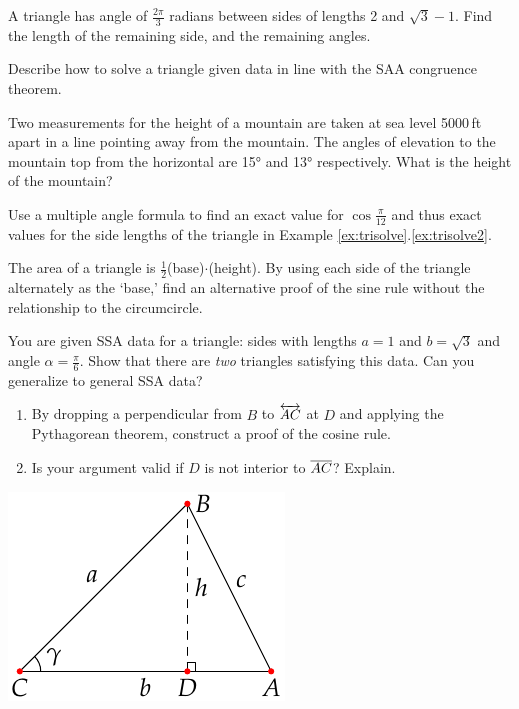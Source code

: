 \begin{exercises}{}{}
	\exstart A triangle has angle of $\frac{2\pi}3$ radians between sides of lengths 2 and $\sqrt 3-1$. Find the length of the remaining side, and the remaining angles.\vspace{-2pt}
	\begin{enumerate}\setcounter{enumi}{1}	
		\item Describe how to solve a triangle given data in line with the SAA congruence theorem.
		
		
		\item Two measurements for the height of a mountain are taken at sea level 5000\,ft apart in a line pointing away from the mountain. The angles of elevation to the mountain top from the horizontal are \ang{15} and \ang{13} respectively. What is the height of the mountain?
		
		
		\item Use a multiple angle formula to find an exact value for $\cos\frac{\pi}{12}$ and thus exact values for the side lengths of the triangle in Example \ref*{ex:trisolve}.\ref{ex:trisolve2}.
		
		
		\item The area of a triangle is $\frac 12$(base)$\cdot$(height). By using each side of the triangle alternately as the `base,' find an alternative proof of the sine rule without the relationship to the circumcircle. 
		
		
		\item You are given SSA data for a triangle: sides with lengths $a=1$ and $b=\sqrt 3$ and angle $\alpha=\frac\pi 6$. Show that there are \emph{two} triangles satisfying this data. Can you generalize to general SSA data?
		 
	
		\begin{minipage}[t]{0.72\linewidth}\vspace{-8pt}	
			\item\begin{enumerate}
			  \item By dropping a perpendicular from $B$ to $\overleftrightarrow{AC}$ at $D$ and applying the Pythagorean theorem, construct a proof of the cosine rule.
		 		
		 		\item Is your argument valid if $D$ is not interior to $\overline{AC}$? Explain.
			\end{enumerate}
		\end{minipage}
		\hfill
		\begin{minipage}[t]{0.27\linewidth}\vspace{-12pt}
			\flushright\includegraphics[scale=0.8]{angles-cosrule}
		\end{minipage}
	

\end{enumerate}
\end{exercises}
